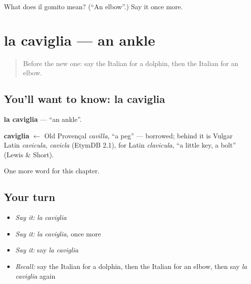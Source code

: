 \begin{tcolorbox}[breakable,colback=teal!4,colframe=teal!35!black,title={Before you move on}]
What does il gomito mean? (\textquotedblleft{}An elbow\textquotedblright{}.) Say it once more.
\end{tcolorbox}
\section[la caviglia]{la caviglia — an ankle}

\label{lesson:IT-C122-caviglia}



\begin{quote}
Before the new one: say the Italian for a dolphin, then the Italian for an elbow.
\end{quote}

\subsection*{You'll want to know: la caviglia}
\textbf{la caviglia} — \textquotedblleft{}an ankle\textquotedblright{}.

\begin{cousinweb}
\textbf{caviglia} $\leftarrow$ Old Provençal \emph{cavilla}, \textquotedblleft{}a peg\textquotedblright{} — borrowed; behind it is Vulgar Latin \emph{cavicula}, \emph{cavicla} (EtymDB 2.1), for Latin \emph{clavicula}, \textquotedblleft{}a little key, a bolt\textquotedblright{} (Lewis \& Short).
\end{cousinweb}

\begin{grammarlens}[title={What you've built}]
One more word for this chapter.
\end{grammarlens}

\subsection*{Your turn}
\begin{itemize}
\raggedright
  \item \emph{Say it:} \emph{la caviglia}
  \item \emph{Say it:} \emph{la caviglia}, once more
  \item \emph{Say it:} say \emph{la caviglia}
  \item \emph{Recall:} say the Italian for a dolphin, then the Italian for an elbow, then say \emph{la caviglia} again
\end{itemize}

